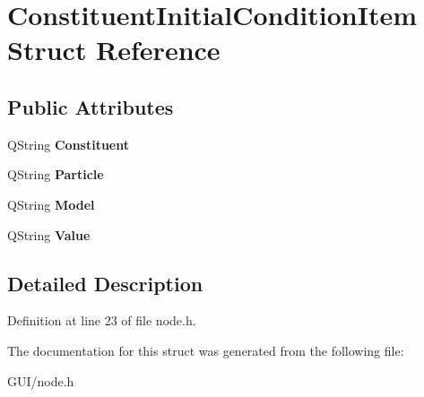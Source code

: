 \hypertarget{struct_constituent_initial_condition_item}{}\section{Constituent\+Initial\+Condition\+Item Struct Reference}
\label{struct_constituent_initial_condition_item}
\subsection*{Public Attributes}
\begin{DoxyCompactItemize}
\item 
\mbox{\label{struct_constituent_initial_condition_item_a25ec96f73bc322af1fee2164357e289f}} 
Q\+String {\bfseries Constituent}
\item 
\mbox{\label{struct_constituent_initial_condition_item_a1694c6ff35b08cea6d56ed69831bc728}} 
Q\+String {\bfseries Particle}
\item 
\mbox{\label{struct_constituent_initial_condition_item_ab2f62247c0b12f981fccaee6cbb91e03}} 
Q\+String {\bfseries Model}
\item 
\mbox{\label{struct_constituent_initial_condition_item_a44c932c41fb0b10c6f5be2d096b73bfa}} 
Q\+String {\bfseries Value}
\end{DoxyCompactItemize}


\subsection{Detailed Description}


Definition at line 23 of file node.\+h.



The documentation for this struct was generated from the following file\+:\begin{DoxyCompactItemize}
\item 
G\+U\+I/node.\+h\end{DoxyCompactItemize}
